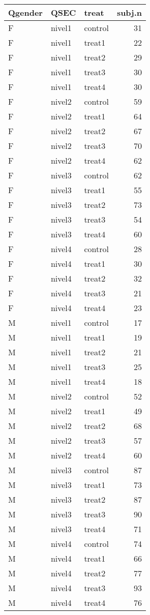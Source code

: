 \begin{tabular}{lllr}
  \hline
Qgender & QSEC & treat & subj.n \\ 
  \hline
F & nivel1 & control &  31 \\ 
  F & nivel1 & treat1 &  22 \\ 
  F & nivel1 & treat2 &  29 \\ 
  F & nivel1 & treat3 &  30 \\ 
  F & nivel1 & treat4 &  30 \\ 
  F & nivel2 & control &  59 \\ 
  F & nivel2 & treat1 &  64 \\ 
  F & nivel2 & treat2 &  67 \\ 
  F & nivel2 & treat3 &  70 \\ 
  F & nivel2 & treat4 &  62 \\ 
  F & nivel3 & control &  62 \\ 
  F & nivel3 & treat1 &  55 \\ 
  F & nivel3 & treat2 &  73 \\ 
  F & nivel3 & treat3 &  54 \\ 
  F & nivel3 & treat4 &  60 \\ 
  F & nivel4 & control &  28 \\ 
  F & nivel4 & treat1 &  30 \\ 
  F & nivel4 & treat2 &  32 \\ 
  F & nivel4 & treat3 &  21 \\ 
  F & nivel4 & treat4 &  23 \\ 
  M & nivel1 & control &  17 \\ 
  M & nivel1 & treat1 &  19 \\ 
  M & nivel1 & treat2 &  21 \\ 
  M & nivel1 & treat3 &  25 \\ 
  M & nivel1 & treat4 &  18 \\ 
  M & nivel2 & control &  52 \\ 
  M & nivel2 & treat1 &  49 \\ 
  M & nivel2 & treat2 &  68 \\ 
  M & nivel2 & treat3 &  57 \\ 
  M & nivel2 & treat4 &  60 \\ 
  M & nivel3 & control &  87 \\ 
  M & nivel3 & treat1 &  73 \\ 
  M & nivel3 & treat2 &  87 \\ 
  M & nivel3 & treat3 &  90 \\ 
  M & nivel3 & treat4 &  71 \\ 
  M & nivel4 & control &  74 \\ 
  M & nivel4 & treat1 &  66 \\ 
  M & nivel4 & treat2 &  77 \\ 
  M & nivel4 & treat3 &  93 \\ 
  M & nivel4 & treat4 &  76 \\ 
   \hline
\end{tabular}

